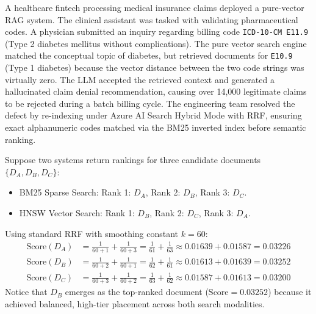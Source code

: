 \begin{realworldbox}
A healthcare fintech processing medical insurance claims deployed a pure-vector RAG system. The clinical assistant was tasked with validating pharmaceutical codes. A physician submitted an inquiry regarding billing code \texttt{ICD-10-CM E11.9} (Type 2 diabetes mellitus without complications). The pure vector search engine matched the conceptual topic of diabetes, but retrieved documents for \texttt{E10.9} (Type 1 diabetes) because the vector distance between the two code strings was virtually zero. The LLM accepted the retrieved context and generated a hallucinated claim denial recommendation, causing over 14,000 legitimate claims to be rejected during a batch billing cycle. The engineering team resolved the defect by re-indexing under Azure AI Search Hybrid Mode with RRF, ensuring exact alphanumeric codes matched via the BM25 inverted index before semantic ranking.
\end{realworldbox}

\begin{tryityourselfbox}
Suppose two systems return rankings for three candidate documents $\{D_A, D_B, D_C\}$:
\begin{itemize}[leftmargin=12pt]
  \item BM25 Sparse Search: Rank 1: $D_A$, Rank 2: $D_B$, Rank 3: $D_C$.
  \item HNSW Vector Search: Rank 1: $D_B$, Rank 2: $D_C$, Rank 3: $D_A$.
\end{itemize}
Using standard RRF with smoothing constant $k = 60$:
\begin{align*}
\text{Score}(D_A) &= \frac{1}{60 + 1} + \frac{1}{60 + 3} = \frac{1}{61} + \frac{1}{63} \approx 0.01639 + 0.01587 = 0.03226 \\
\text{Score}(D_B) &= \frac{1}{60 + 2} + \frac{1}{60 + 1} = \frac{1}{62} + \frac{1}{61} \approx 0.01613 + 0.01639 = 0.03252 \\
\text{Score}(D_C) &= \frac{1}{60 + 3} + \frac{1}{60 + 2} = \frac{1}{63} + \frac{1}{62} \approx 0.01587 + 0.01613 = 0.03200
\end{align*}
Notice that $D_B$ emerges as the top-ranked document ($\text{Score} = 0.03252$) because it achieved balanced, high-tier placement across both search modalities.
\end{tryityourselfbox}

